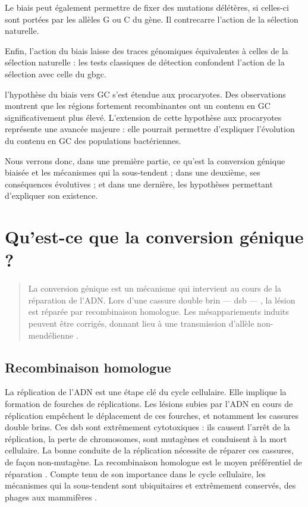 \documentclass[11pt, oneside]{scrartcl}
\begin{document}
Le biais peut également permettre de fixer des mutations délétères, si celles-ci
sont portées par les allèles G ou C du gène. Il contrecarre l'action de la
sélection naturelle\cite{galtier_gc-biased_2009, galtier_adaptation_2007}.

Enfin, l'action du biais laisse des traces génomiques équivalentes à celles de
la sélection naturelle : les tests classiques de détection confondent l'action
de la sélection avec celle du \ac{gbgc}\cite{ratnakumar_detecting_2010}.


 l'hypothèse du biais vers GC s'est étendue aux
procaryotes\cite{lassalle_gc-content_2015}. Des observations montrent que les
régions fortement recombinantes ont un contenu en GC significativement plus
élevé. L'extension de cette hypothèse aux procaryotes représente une avancée
majeure : elle pourrait permettre d'expliquer l'évolution du contenu en GC des
populations bactériennes.

Nous verrons donc, dans une première partie, ce qu'est la conversion génique
biaisée et les mécanismes qui la sous-tendent ; dans une deuxième, ses
conséquences évolutives ; et dans une dernière, les hypothèses permettant
d'expliquer son existence.

\section{Qu'est-ce que la conversion génique ?}
\label{sec:orgheadline8}

\begin{quote}
La conversion génique est un mécanisme qui intervient au cours de la réparation
de l'ADN. Lors d'une cassure double brin --- \ac{dsb} --- , la lésion est réparée par
recombinaison homologue. Les mésappariements induits peuvent être corrigés,
donnant lieu à une transmission d'allèle non-mendélienne \cite{chen_mechanism_2008}. 
\end{quote}


\subsection{Recombinaison homologue}
\label{sec:orgheadline6}

La réplication de l'ADN est une étape clé du cycle cellulaire. Elle implique la
formation de fourches de réplications. Les lésions subies par l'ADN en cours de
réplication empêchent le déplacement de ces fourches, et notamment les cassures
double brins. Ces \ac{dsb} sont extrêmement cytotoxiques : ils causent l'arrêt
de la réplication, la perte de chromosomes, sont mutagènes et conduisent à la
mort cellulaire\cite{watson_molecular_2014}. La bonne conduite de la réplication
nécessite de réparer ces cassures, de façon non-mutagène. La recombinaison
homologue est le moyen préférentiel de réparation \cite{lusetti_bacterial_2002}.
Compte tenu de son importance dans le cycle cellulaire, les mécanismes qui la
sous-tendent sont ubiquitaires et extrêmement conservés, des phages aux
mammifères \cite{cromie_recombination_2001}.
\end{document}
